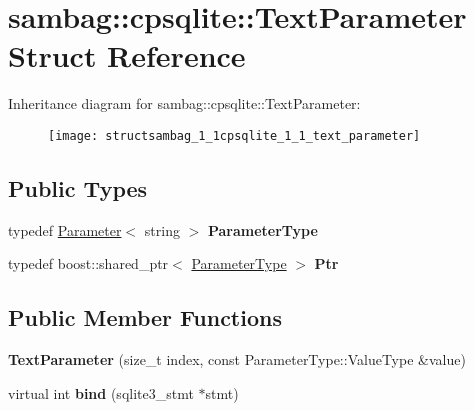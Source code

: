 \hypertarget{structsambag_1_1cpsqlite_1_1_text_parameter}{
\section{sambag::cpsqlite::TextParameter Struct Reference}
\label{structsambag_1_1cpsqlite_1_1_text_parameter}
}
Inheritance diagram for sambag::cpsqlite::TextParameter:\begin{figure}[H]
\begin{center}
\leavevmode
\texttt{[image: structsambag\_1\_1cpsqlite\_1\_1\_text\_parameter]}
\end{center}
\end{figure}
\subsection*{Public Types}
\begin{DoxyCompactItemize}
\item 
\hypertarget{structsambag_1_1cpsqlite_1_1_text_parameter_ae6cf42baee96468f195087261acd2a43}{
typedef \hyperlink{structsambag_1_1cpsqlite_1_1_parameter}{Parameter}$<$ string $>$ {\bfseries ParameterType}}
\label{structsambag_1_1cpsqlite_1_1_text_parameter_ae6cf42baee96468f195087261acd2a43}

\item 
\hypertarget{structsambag_1_1cpsqlite_1_1_text_parameter_ad9847de930b3c3bb34cebd4b61e16391}{
typedef boost::shared\_\-ptr$<$ \hyperlink{structsambag_1_1cpsqlite_1_1_parameter}{ParameterType} $>$ {\bfseries Ptr}}
\label{structsambag_1_1cpsqlite_1_1_text_parameter_ad9847de930b3c3bb34cebd4b61e16391}

\end{DoxyCompactItemize}
\subsection*{Public Member Functions}
\begin{DoxyCompactItemize}
\item 
\hypertarget{structsambag_1_1cpsqlite_1_1_text_parameter_aa4f6b6c381502785636702325276fd19}{
{\bfseries TextParameter} (size\_\-t index, const ParameterType::ValueType \&value)}
\label{structsambag_1_1cpsqlite_1_1_text_parameter_aa4f6b6c381502785636702325276fd19}

\item 
\hypertarget{structsambag_1_1cpsqlite_1_1_text_parameter_ac4f2fb1361cbba2910a1b679322bf96c}{
virtual int {\bfseries bind} (sqlite3\_\-stmt $\ast$stmt)}
\label{structsambag_1_1cpsqlite_1_1_text_parameter_ac4f2fb1361cbba2910a1b679322bf96c}

\end{DoxyCompactItemize}
